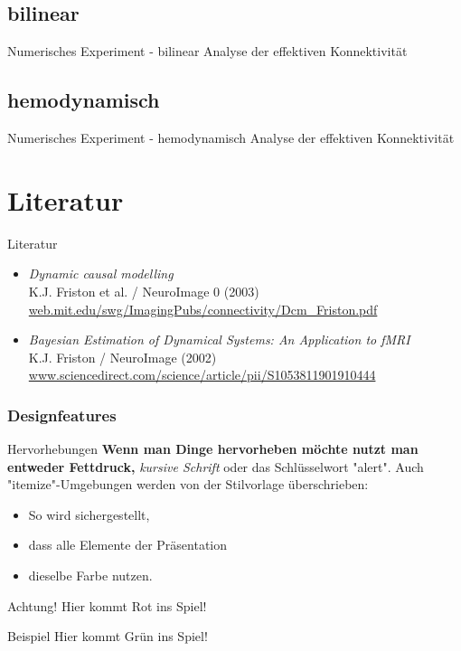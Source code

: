 \documentclass{beamer}
\begin{document}
\subsection{bilinear}
	\begin{frame}{Numerisches Experiment - bilinear}
		Analyse der effektiven Konnektivität
	\end{frame}
\subsection{hemodynamisch}
	\begin{frame}{Numerisches Experiment - hemodynamisch}
		Analyse der effektiven Konnektivität
	\end{frame}

\section{Literatur}
	\begin{frame}{Literatur}
		\begin{itemize}
			\item \textit{Dynamic causal modelling} \\ {\small K.J. Friston et al. / NeuroImage 0 (2003)} \\ {\footnotesize \url{web.mit.edu/swg/ImagingPubs/connectivity/Dcm_Friston.pdf}}
			\item \textit{{\small Bayesian Estimation of Dynamical Systems: An Application to fMRI}} \\ {\small K.J. Friston / NeuroImage (2002)} \\ {\footnotesize \url{www.sciencedirect.com/science/article/pii/S1053811901910444}}
		\end{itemize}
	\end{frame}



\begin{frame}
	\frametitle{Designfeatures}
	\begin{block}{Hervorhebungen}
	 \textbf{Wenn man Dinge hervorheben möchte nutzt man entweder Fettdruck,} \textit{ kursive Schrift} \alert{ oder das Schlüsselwort "alert"}. Auch "itemize"-Umgebungen werden von der Stilvorlage überschrieben:
	\end{block}
	\pause
	\begin{itemize}
	 \item So wird sichergestellt,
	 \item dass alle Elemente der Präsentation 
	 \item dieselbe Farbe nutzen.
	\end{itemize}
	\begin{alertblock}{Achtung!}
	 Hier kommt Rot ins Spiel!	
	\end{alertblock}
	\begin{exampleblock}{Beispiel}
	 Hier kommt Grün ins Spiel!
	\end{exampleblock}
\end{frame}
\end{document}
